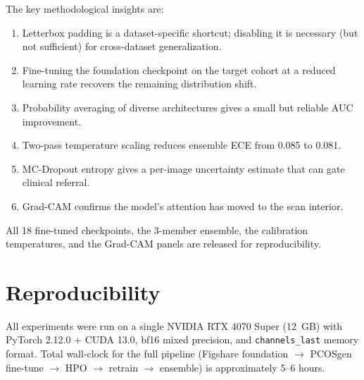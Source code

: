 \documentclass[11pt,twocolumn]{article}
\newcommand{\PCOS}{PCOS}
\newcommand{\ECE}{ECE}
\newcommand{\AUC}{AUC}
\newcommand{\GradCAM}{Grad-CAM}
\begin{document}
The key methodological insights are:
\begin{enumerate}[leftmargin=*,noitemsep,topsep=2pt]
  \item Letterbox padding is a dataset-specific shortcut; disabling it is
        necessary (but not sufficient) for cross-dataset generalization.
  \item Fine-tuning the foundation checkpoint on the target cohort at a
        reduced learning rate recovers the remaining distribution shift.
  \item Probability averaging of diverse architectures gives a small but
        reliable \AUC{} improvement.
  \item Two-pass temperature scaling reduces ensemble \ECE{} from 0.085 to
        0.081.
  \item MC-Dropout entropy gives a per-image uncertainty estimate that
        can gate clinical referral.
  \item \GradCAM{} confirms the model's attention has moved to the scan
        interior.
\end{enumerate}

All 18 fine-tuned checkpoints, the 3-member ensemble, the calibration
temperatures, and the \GradCAM{} panels are released for reproducibility.

\section{Reproducibility}

All experiments were run on a single NVIDIA RTX 4070 Super (12~GB) with
PyTorch 2.12.0 + CUDA 13.0, bf16 mixed precision, and
\texttt{channels\_last} memory format. Total wall-clock for the full
pipeline (Figshare foundation $\rightarrow$ \PCOS{}gen fine-tune
$\rightarrow$ HPO $\rightarrow$ retrain $\rightarrow$ ensemble)
is approximately 5--6 hours.
\end{document}
